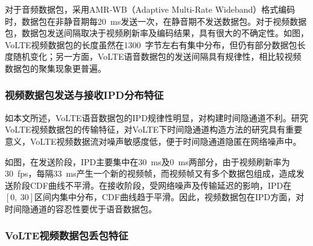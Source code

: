 对于音频数据包，采用AMR-WB（Adaptive Multi-Rate Wideband）格式编码时，数据包在非静音期每{20\ ms}发送一次，在静音期不发送数据包。对于视频数据包，数据包发送间隔取决于视频刷新率及编码结果，具有很大的不确定性。如图，VoLTE视频数据包的长度虽然在{1300\ 字节}左右有集中分布，但仍有部分数据包长度随机变化；另一方面，VoLTE语音数据包的发送间隔具有规律性，相比较视频数据包的聚集现象更普遍。

\subsubsection{视频数据包发送与接收IPD分布特征}
\label{chap:backinfo:volte:packets:ipd}
如本文所述，VoLTE语音数据包的IPD规律性明显，对构建时间隐通道不利。研究VoLTE视频数据包的传输特征，对VoLTE下时间隐通道构造方法的研究具有重要意义，VoLTE视频数据流对噪声敏感度低，便于时间隐通道隐匿在网络噪声中。


如图，在发送阶段，IPD主要集中在{30\ ms}及{0\ ms}两部分，由于视频刷新率为{30\ fps}，每隔{33\ ms}产生一个新的视频帧，而视频帧又有多个数据包组成，造成发送阶段CDF曲线不平滑。在接收阶段，受网络噪声及传输延迟的影响，IPD在$[0,\ 30]$区间内集中分布，CDF曲线趋于平滑。因此，视频数据包在IPD方面，对时间隐通道的容忍性要优于语音数据包。

\subsubsection{VoLTE视频数据包丢包特征}
\label{chap:backinfo:volte:packets:dropout}

